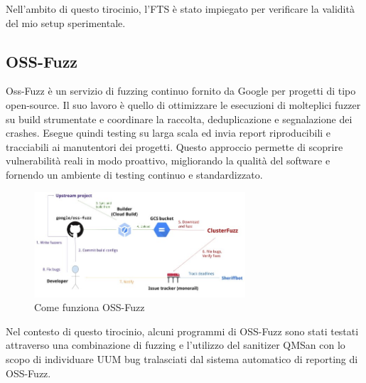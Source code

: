 Nell’ambito di questo tirocinio, l’FTS è stato impiegato per verificare la validità del mio setup sperimentale.  

\subsection{OSS-Fuzz}

Oss-Fuzz è un servizio di fuzzing continuo fornito da Google per progetti di tipo open-source. Il suo lavoro è quello di ottimizzare le esecuzioni di molteplici fuzzer su build strumentate e coordinare la raccolta, deduplicazione e segnalazione dei crashes. Esegue quindi testing su larga scala ed invia report riproducibili e tracciabili ai manutentori dei progetti. Questo approccio permette di scoprire vulnerabilità reali in modo proattivo, migliorando la qualità del software e fornendo un ambiente di testing continuo e standardizzato. 

\begin{figure}[htbp]        
  \centering               
  \includegraphics[width=0.7\textwidth]{immagini/oss-fuzz.jpg}  
  \caption{Come funziona OSS-Fuzz}  
  \label{fig:oss-fuzz}      
\end{figure}

Nel contesto di questo tirocinio, alcuni programmi di OSS-Fuzz sono stati testati attraverso una combinazione di fuzzing e l’utilizzo del sanitizer QMSan con lo scopo di individuare UUM bug tralasciati dal sistema automatico di reporting di OSS-Fuzz.
